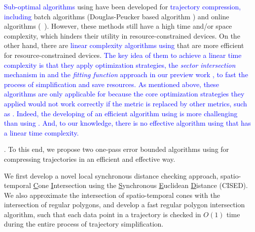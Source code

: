 \textcolor{blue}{Sub-optimal \lsa algorithms} using \sed have been developed for \textcolor{blue}{trajectory compression, including} batch algorithms (\eg Douglas-Peucker based algorithm \dpsed \cite{Meratnia:Spatiotemporal}) and online algorithms (\eg\ \squishe \cite{Muckell:Compression}).
However, these methods still have a high time and/or space complexity, which hinders their utility in resource-constrained devices. %
%
On the other hand, there are \textcolor{blue}{linear complexity \lsa algorithms using \ped} \cite{Williams:Longest, Sklansky:Cone, Dunham:Cone, Zhao:Sleeve, Lin:Operb} that are more efficient for resource-constrained devices. 
%
\textcolor{blue}{The key idea of them to achieve a linear time complexity is that they apply optimization strategies, \eg the \textit{sector intersection} mechanism in \cite{Williams:Longest, Sklansky:Cone, Dunham:Cone, Zhao:Sleeve} and the \textit{fitting function} approach in our preview work \cite {Lin:Operb}, to fast the process of simplification and save resources. 
As mentioned above, these algorithms are only applicable for \ped because the core optimization strategies they applied would not work correctly if the \ped metric is replaced by other metrics, such as \sed.} 
\textcolor{blue}{Indeed, {the developing of an efficient \lsa algorithm using \sed is more challenging than using \ped}.}
\textcolor{blue}{And, to our knowledge, there is no effective \lsa algorithm using \sed that has a linear time complexity.}





.
To this end, we propose two one-pass error bounded \lsa algorithms using \sed for compressing trajectories in an efficient and effective way. %

 We first develop a novel local synchronous distance checking approach, \ie spatio-temporal \underline{C}one \underline{I}ntersection using the \underline{S}ynchronous \underline{E}uclidean \underline{D}istance (CISED).
We also approximate the intersection of spatio-temporal cones with the intersection of regular polygons, and develop a fast regular polygon intersection algorithm, such that each data point in a trajectory is checked in $O(1)$ time during the entire process of trajectory simplification.


